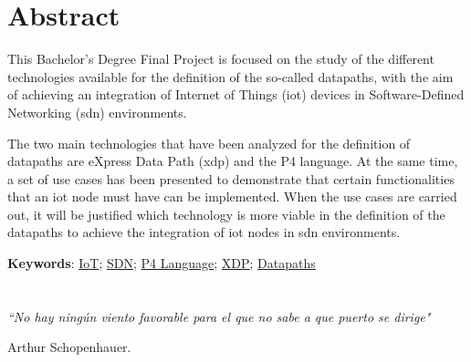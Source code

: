 \chapter{Abstract}
\thispagestyle{empty}

This Bachelor's Degree Final Project is focused on the study of the different technologies available for the definition of the so-called datapaths, with the aim of achieving an integration of Internet of Things (\gls{iot}) devices in Software-Defined Networking (\gls{sdn}) environments. \newline

The two main technologies that have been analyzed for the definition of datapaths are
eXpress Data Path (\gls{xdp}) and the P4 language. At the same time, a set of use cases has been presented to demonstrate that certain functionalities that an \gls{iot} node must have can be implemented. When the use cases are carried out, it will be justified which technology is more viable in the definition of the datapaths to achieve the integration of \gls{iot} nodes in \gls{sdn} environments.

\vspace{1cm}

\textbf{Keywords}: \href{https://scholar.google.es/scholar?q=Internet+of+Things}{IoT}; \href{https://www.opennetworking.org/sdn-definition}{SDN};
\href{https://p4.org/}{P4 Language}; \href{https://scholar.google.es/scholar?q=XDP+linux}{XDP};
\href{https://scholar.google.es/scholar?q=Datapaths}{Datapaths}



\cleardoublepage %




\chapter*{}
\setlength{\leftmargin}{0.5\textwidth}
\setlength{\parsep}{0cm}
\addtolength{\topsep}{0.5cm}
\begin{flushright}
	\small\em{
		``No hay ningún viento favorable para el que no sabe a que puerto se dirige"
	}
\end{flushright}
\begin{flushright}
	\small{
		Arthur Schopenhauer.
	}
\end{flushright}
\cleardoublepage %
